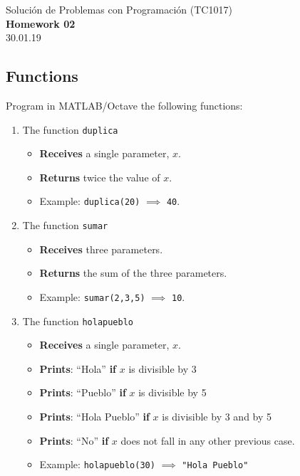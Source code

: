 \documentclass[]{book}
\newcommand{\matlab}[1]{\lstinline[style=Matlab-pyglike]!#1!}
\theoremstyle{definition}
\begin{document}
\begin{center}
{\huge Solución de Problemas con Programación (TC1017)}\\[1.5ex]
{\large \textbf{Homework 02}\\[1.5ex] %
30.01.19} %
\end{center}

\vspace{0.2 cm}

\subsection*{Functions}

Program in MATLAB/Octave the following functions:

\begin{enumerate}[label=\alph*)]
    \itemsep2.5ex
    \item The function \matlab{duplica}
    \begin{itemize}
        \item \textbf{Receives} a single parameter, $x$.
        \item \textbf{Returns} twice the value of $x$.
        \item Example: \matlab{duplica(20)} $\implies$ \matlab{40}.
    \end{itemize}
    \item The function \matlab{sumar}
    \begin{itemize}
        \item \textbf{Receives} three parameters.
        \item \textbf{Returns} the sum of the three parameters.
        \item Example: \matlab{sumar(2,3,5)} $\implies$ \matlab{10}.
    \end{itemize}
    \item The function \matlab{holapueblo}
    \begin{itemize}
        \item \textbf{Receives} a single parameter, $x$.
        \item \textbf{Prints}: ``Hola'' \textbf{if} $x$ is divisible by 3
        \item \textbf{Prints}: ``Pueblo'' \textbf{if} $x$ is divisible by 5
        \item \textbf{Prints}: ``Hola Pueblo'' \textbf{if} $x$ is divisible by 3 and by 5
        \item \textbf{Prints}: ``No'' \textbf{if} $x$ does not fall in any other previous case.
        \item Example: \matlab{holapueblo(30)} $\implies$ \texttt{"Hola Pueblo"}
    \end{itemize}
\end{enumerate}
\end{document}
